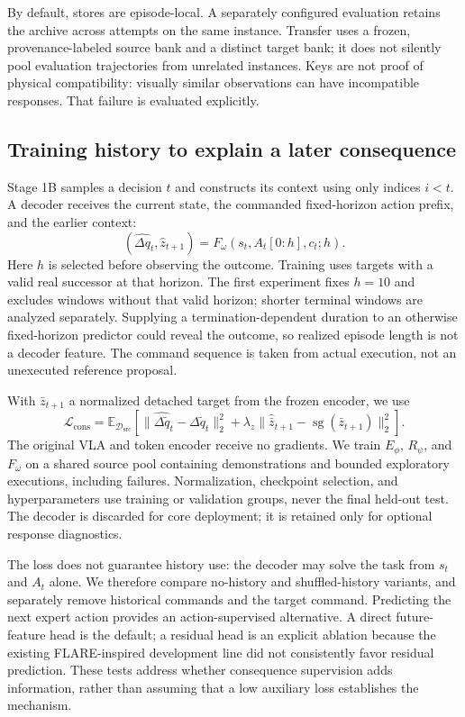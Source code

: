 \documentclass[10pt,letterpaper]{article}
\newcommand{\sg}{\operatorname{sg}}
\newcommand{\D}{\mathcal{D}}
\newcommand{\E}{\mathbb{E}}
\begin{document}
By default, stores are episode-local. A separately configured evaluation retains the archive across attempts on the same instance. Transfer uses a frozen, provenance-labeled source bank and a distinct target bank; it does not silently pool evaluation trajectories from unrelated instances. Keys are not proof of physical compatibility: visually similar observations can have incompatible responses. That failure is evaluated explicitly.

\subsection{Training history to explain a later consequence}
Stage 1B samples a decision $t$ and constructs its context using only indices $i<t$. A decoder receives the current state, the commanded fixed-horizon action prefix, and the earlier context:
\begin{equation}
 (\widehat{\Delta q}_t,\widehat z_{t+1})
       =F_\omega(s_t,A_t[0:h],c_t;h).
 \label{eq:decode}
\end{equation}
Here $h$ is selected before observing the outcome. Training uses targets with a valid real successor at that horizon. The first experiment fixes $h=10$ and excludes windows without that valid horizon; shorter terminal windows are analyzed separately. Supplying a termination-dependent duration to an otherwise fixed-horizon predictor could reveal the outcome, so realized episode length is not a decoder feature. The command sequence is taken from actual execution, not an unexecuted reference proposal.

With $\bar z_{t+1}$ a normalized detached target from the frozen encoder, we use
\begin{equation}
 \mathcal{L}_{\mathrm{cons}}
  =\E_{\D_{\mathrm{src}}}\left[
       \|\widehat{\Delta\widetilde q}_t-\Delta\widetilde q_t\|_2^2
       +\lambda_z\|\widehat{\bar z}_{t+1}-\sg(\bar z_{t+1})\|_2^2
    \right].
 \label{eq:cons}
\end{equation}
The original VLA and token encoder receive no gradients. We train $E_\phi$, $R_\psi$, and $F_\omega$ on a shared source pool containing demonstrations and bounded exploratory executions, including failures. Normalization, checkpoint selection, and hyperparameters use training or validation groups, never the final held-out test. The decoder is discarded for core deployment; it is retained only for optional response diagnostics.

The loss does not guarantee history use: the decoder may solve the task from $s_t$ and $A_t$ alone. We therefore compare no-history and shuffled-history variants, and separately remove historical commands and the target command. Predicting the next expert action provides an action-supervised alternative. A direct future-feature head is the default; a residual head is an explicit ablation because the existing FLARE-inspired development line did not consistently favor residual prediction. These tests address whether consequence supervision adds information, rather than assuming that a low auxiliary loss establishes the mechanism.
\end{document}
